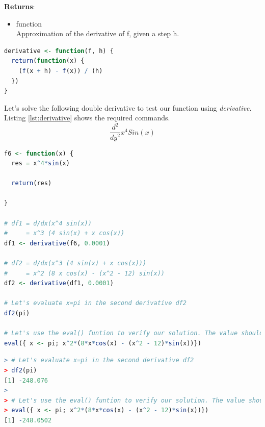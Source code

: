 \documentclass[11pt,a4paper]{article}
\begin{document}
\textbf{Returns}:
\begin{itemize}
  \item {function\\
Approximation of the derivative of f, given a step h.}
\end{itemize}

\clearpage

\begin{lstlisting}[frame=trBL, language=R, caption="The \emph{Riemann 2D} function"
\label{lst:derivativeFunct}]
derivative <- function(f, h) {
  return(function(x) {
    (f(x + h) - f(x)) / (h)
  })
}
\end{lstlisting}

Let's solve the following double derivative to test our function using \emph{derivative}. Listing \ref{lst:derivative} shows the required commands.
$$ \frac{d^2}{d y^2} x^4 Sin(x) $$

\begin{lstlisting}[frame=trBL, language=R, caption="Define the function and implement \emph{derivative}"
\label{lst:derivative}]
f6 <- function(x) {
  res = x^4*sin(x)
  
  return(res)
  
}

# df1 = d/dx(x^4 sin(x))
#     = x^3 (4 sin(x) + x cos(x))
df1 <- derivative(f6, 0.0001)

# df2 = d/dx(x^3 (4 sin(x) + x cos(x)))
#     = x^2 (8 x cos(x) - (x^2 - 12) sin(x))
df2 <- derivative(df1, 0.0001)

# Let's evaluate x=pi in the second derivative df2
df2(pi)

# Let's use the eval() funtion to verify our solution. The value should be around df2(pi)
eval({ x <- pi; x^2*(8*x*cos(x) - (x^2 - 12)*sin(x))})
\end{lstlisting}

\clearpage

\begin{lstlisting}[frame=trBL, language=R, caption="Listing \ref{lst:derivative} output"
\label{lst:derivative_out}]
> # Let's evaluate x=pi in the second derivative df2
> df2(pi)
[1] -248.076
> 
> # Let's use the eval() funtion to verify our solution. The value should be around df2(pi)
> eval({ x <- pi; x^2*(8*x*cos(x) - (x^2 - 12)*sin(x))})
[1] -248.0502
\end{lstlisting}

\end{document}
